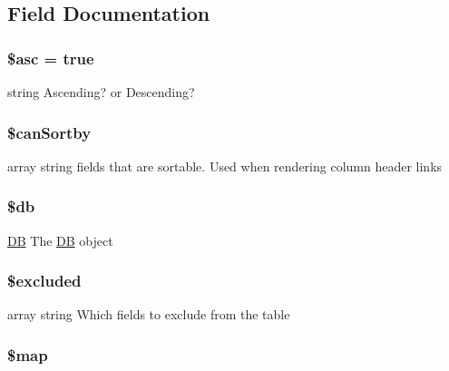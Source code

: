 \subsection{Field Documentation}
\hypertarget{class_db_grid_ab38893e590c3f831edfdcf64fc2aa02c}{
\subsubsection[{\$asc}]{\setlength{\rightskip}{0pt plus 5cm}\$asc = true\hspace{0.3cm}{\ttfamily [protected]}}}\label{class_db_grid_ab38893e590c3f831edfdcf64fc2aa02c}
string Ascending? or Descending? \hypertarget{class_db_grid_a233ec0718ad15633825ab07d1f3a744b}{
\subsubsection[{\$can\-Sortby}]{\setlength{\rightskip}{0pt plus 5cm}\$can\-Sortby\hspace{0.3cm}{\ttfamily [protected]}}}\label{class_db_grid_a233ec0718ad15633825ab07d1f3a744b}
array string fields that are sortable. Used when rendering column header links \hypertarget{class_db_grid_a1fa3127fc82f96b1436d871ef02be319}{
\subsubsection[{\$db}]{\setlength{\rightskip}{0pt plus 5cm}\$db\hspace{0.3cm}{\ttfamily [protected]}}}\label{class_db_grid_a1fa3127fc82f96b1436d871ef02be319}
\hyperlink{class_d_b}{D\-B} The \hyperlink{class_d_b}{D\-B} object \hypertarget{class_db_grid_a461d2a3e41e45e6ced688a7ae506c407}{
\subsubsection[{\$excluded}]{\setlength{\rightskip}{0pt plus 5cm}\$excluded\hspace{0.3cm}{\ttfamily [protected]}}}\label{class_db_grid_a461d2a3e41e45e6ced688a7ae506c407}
array string Which fields to exclude from the table \hypertarget{class_db_grid_acdcfcd6e65900bdadd894106750cf520}{
\subsubsection[{\$map}]{\setlength{\rightskip}{0pt plus 5cm}\$map\hspace{0.3cm}{\ttfamily [protected]}}}\label{class_db_grid_acdcfcd6e65900bdadd894106750cf520}
